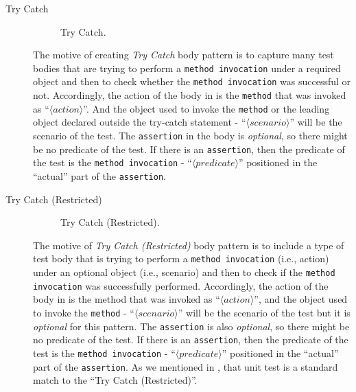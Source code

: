 \documentclass[proposal.tex]{subfiles}
\begin{document}
\begin{description}
\item[Try Catch]

\begin{figure}[t]
\centering
    \begin{subfigure}{0.65\textwidth}
    \end{subfigure}
\caption{Try Catch.}
\label{tryCP}
\end{figure}

The motive of creating \textit{Try Catch} body pattern is to capture many test bodies that are trying to perform a \texttt{method invocation} under a required object and then to check whether the \texttt{method invocation} was successful or not.
%
Accordingly, the action of the body in  is the \texttt{method} that was invoked as \enquote{$\langle action \rangle$}.
%
And the object used to invoke the \texttt{method} or the leading object declared outside the try-catch statement - \enquote{$\langle scenario \rangle$} will be the scenario of the test.
%
The \texttt{assertion} in the body is \emph{optional}, so there might be no predicate of the test.
%
If there is an \texttt{assertion}, then the predicate of the test is the \texttt{method invocation} - \enquote{$\langle predicate \rangle$} positioned in the \enquote{actual} part of the \texttt{assertion}.


\item[Try Catch (Restricted)] 

\begin{figure}[t]
\centering
    \begin{subfigure}{0.8\textwidth}
    \end{subfigure}
\caption{Try Catch (Restricted).}
\label{tc_one}
\end{figure}

The motive of \textit{Try Catch (Restricted)} body pattern is to include a type of test body that is trying to perform a \texttt{method invocation} (i.e., action) under an optional object (i.e., scenario) and then to check if the \texttt{method invocation} was successfully performed.
%
Accordingly, the action of the body in  is the method that was invoked as \enquote{$\langle action \rangle$}, and the object used to invoke the \texttt{method} - \enquote{$\langle scenario \rangle$} will be the scenario of the test but it is \emph{optional} for this pattern.
%
The \texttt{assertion} is also \emph{optional}, so there might be no predicate of the test.
%
If there is an \texttt{assertion}, then the predicate of the test is the \texttt{method invocation} - \enquote{$\langle predicate \rangle$} positioned in the \enquote{actual} part of the \texttt{assertion}.
%
As we mentioned in , that unit test is a standard match to the \enquote{Try Catch (Restricted)}.



\end{description}
\end{document}
